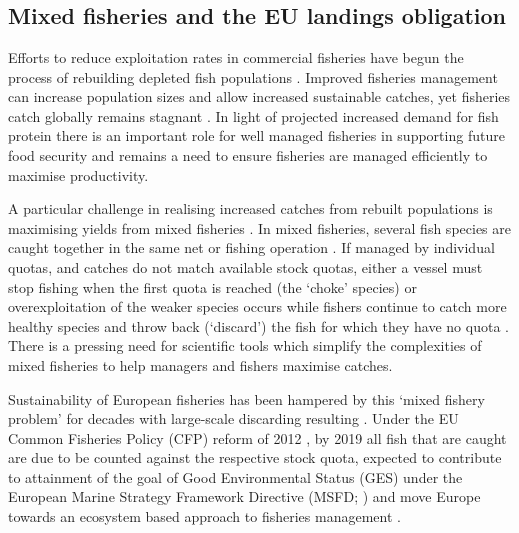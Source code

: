 \documentclass{nature}
\begin{document}
\section*{}
\subsection{Mixed fisheries and the EU landings obligation} 

 Efforts to reduce exploitation rates in commercial fisheries
have begun the process of rebuilding depleted fish populations \cite{Worm2009}.
Improved fisheries management  can increase
population sizes and allow increased sustainable catches, yet fisheries catch
globally remains stagnant . In light of projected
increased demand for fish protein  there is an
important role for well managed fisheries in supporting future food security
\cite{Mcclanahan2015} and  remains a need to ensure fisheries
are managed efficiently to maximise productivity.

A particular challenge in realising increased catches from rebuilt populations
is maximising yields from mixed fisheries \cite{Branch2008, Kuriyama2016,
	Ulrich2016}. In mixed fisheries,  several fish species are caught together in the same net or
fishing operation . If managed by
individual quotas, and catches do not match available stock quotas, either a
vessel must stop fishing when the first quota is reached (the `choke' species)
or overexploitation of the weaker species occurs while fishers continue to
catch more healthy species and throw back (`discard') the fish for which they
have no quota \cite{Batsleer2015}. There is a pressing need
for scientific tools which simplify the complexities of mixed fisheries to help
managers and fishers maximise catches. 

Sustainability of European fisheries has been hampered by this `mixed fishery
problem' for decades with large-scale discarding resulting \cite{Uhlmann2014}.
 Under the EU Common Fisheries
Policy (CFP) reform of 2012 , by 2019 all fish that are caught are due to be
counted against the respective stock quota, expected to contribute to attainment of the goal of Good
Environmental Status (GES) under the European Marine Strategy Framework
Directive (MSFD; \cite{EuropeanParliament2008}) and move Europe towards an
ecosystem based approach to fisheries management \cite{Garcia2003}. 
\end{document}
